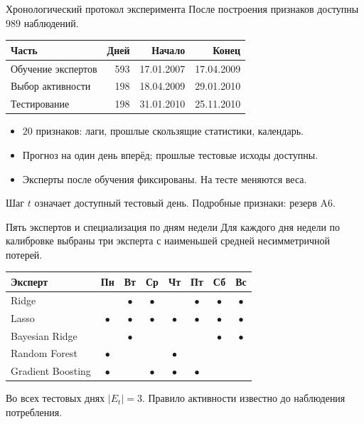 \documentclass[11pt,aspectratio=169]{beamer}
\begin{document}
\begin{frame}{Хронологический протокол эксперимента}
  После построения признаков доступны $989$ наблюдений.
  \medskip
  \begin{center}
    \begin{tabular}{@{}lrrr@{}}
      \toprule
      Часть & Дней & Начало & Конец\\
      \midrule
      Обучение экспертов & 593 & 17.01.2007 & 17.04.2009\\
      Выбор активности & 198 & 18.04.2009 & 29.01.2010\\
      Тестирование & 198 & 31.01.2010 & 25.11.2010\\
      \bottomrule
    \end{tabular}
  \end{center}
  \begin{itemize}
    \item $20$ признаков: лаги, прошлые скользящие статистики, календарь.
    \item Прогноз на один день вперёд; прошлые тестовые исходы доступны.
    \item Эксперты после обучения фиксированы. На тесте меняются веса.
  \end{itemize}
  \par\vfill{\scriptsize Шаг $t$ означает доступный тестовый день. Подробные признаки: резерв A6.\par}
\end{frame}

\begin{frame}{Пять экспертов и специализация по дням недели}
  Для каждого дня недели по калибровке выбраны три эксперта
  с наименьшей средней несимметричной потерей.
  \begin{center}
    \begin{tabular}{@{}l*{7}{c}@{}}
\toprule
Эксперт & Пн & Вт & Ср & Чт & Пт & Сб & Вс \\
\midrule
Ridge &  & $\bullet$ & $\bullet$ &  & $\bullet$ & $\bullet$ & $\bullet$ \\
Lasso & $\bullet$ & $\bullet$ & $\bullet$ & $\bullet$ & $\bullet$ & $\bullet$ & $\bullet$ \\
Bayesian Ridge &  & $\bullet$ &  &  &  & $\bullet$ & $\bullet$ \\
Random Forest & $\bullet$ &  &  & $\bullet$ &  &  &  \\
Gradient Boosting & $\bullet$ &  & $\bullet$ & $\bullet$ & $\bullet$ &  &  \\
\bottomrule
\end{tabular}
  \end{center}
  Во всех тестовых днях $|E_t|=3$.
  Правило активности известно до наблюдения потребления.
\end{frame}
\end{document}

